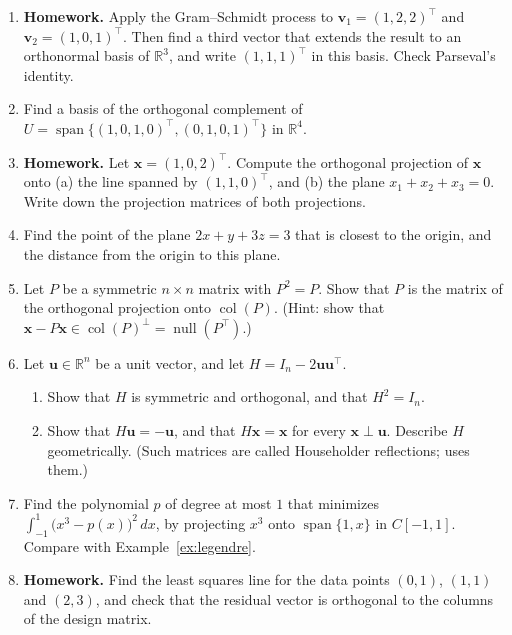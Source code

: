 \documentclass[11pt]{article}
\newcommand{\homework}{\textcolor{red!70!black}{\textbf{Homework.}}}
\newcommand{\py}[1]{\texttt{\detokenize{#1}}}
\theoremstyle{definition}
\theoremstyle{plain}
\theoremstyle{remark}
\DeclareMathOperator{\Null}{null}
\DeclareMathOperator{\col}{col}
\DeclareMathOperator{\Span}{span}
\begin{document}
\begin{enumerate}[leftmargin=*]
\begin{enumerate}[label=(\alph*)]
        \item The planes $x + y + z = 3$ and $x - y + z = 5$ intersect in a line $\ell$. Find an equation of the plane through the origin that is perpendicular to $\ell$.
    \end{enumerate}
    \item \homework{} Apply the Gram--Schmidt process to $\mathbf{v}_1 = (1, 2, 2)^\top$ and $\mathbf{v}_2 = (1, 0, 1)^\top$. Then find a third vector that extends the result to an orthonormal basis of $\mathbb{R}^3$, and write $(1, 1, 1)^\top$ in this basis. Check Parseval's identity.
    \item Find a basis of the orthogonal complement of $U = \Span\{(1, 0, 1, 0)^\top, (0, 1, 0, 1)^\top\}$ in $\mathbb{R}^4$.
    \item \homework{} Let $\mathbf{x} = (1, 0, 2)^\top$. Compute the orthogonal projection of $\mathbf{x}$ onto (a) the line spanned by $(1, 1, 0)^\top$, and (b) the plane $x_1 + x_2 + x_3 = 0$. Write down the projection matrices of both projections.
    \item Find the point of the plane $2x + y + 3z = 3$ that is closest to the origin, and the distance from the origin to this plane.
    \item Let $P$ be a symmetric $n \times n$ matrix with $P^2 = P$. Show that $P$ is the matrix of the orthogonal projection onto $\col(P)$. (Hint: show that $\mathbf{x} - P\mathbf{x} \in \col(P)^\perp = \Null(P^\top)$.)
    \item Let $\mathbf{u} \in \mathbb{R}^n$ be a unit vector, and let $H = I_n - 2\mathbf{u}\mathbf{u}^\top$.
    \begin{enumerate}[label=(\alph*)]
        \item Show that $H$ is symmetric and orthogonal, and that $H^2 = I_n$.
        \item Show that $H\mathbf{u} = -\mathbf{u}$, and that $H\mathbf{x} = \mathbf{x}$ for every $\mathbf{x} \perp \mathbf{u}$. Describe $H$ geometrically. (Such matrices are called Householder reflections; \py{np.linalg.qr} uses them.)
    \end{enumerate}
    \item\label{ex2:best-poly} Find the polynomial $p$ of degree at most $1$ that minimizes $\int_{-1}^1 \big(x^3 - p(x)\big)^2 \, dx$, by projecting $x^3$ onto $\Span\{1, x\}$ in $C[-1, 1]$. Compare with Example~\ref{ex:legendre}.
    \item \homework{} Find the least squares line for the data points $(0, 1)$, $(1, 1)$ and $(2, 3)$, and check that the residual vector is orthogonal to the columns of the design matrix.

\end{enumerate}
\end{document}
